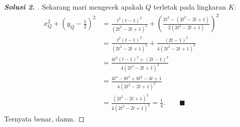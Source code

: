 \begin{proof}[\textbf{Solusi 2. }]
Sekarang mari mengecek apakah $Q$ terletak pada lingkaran $K$:
\begin{align*}
    x_Q^2 + \left(y_Q - \tfrac{1}{2}\right)^2 
    &= \frac{t^2(t-1)^2}{(2t^2-2t+1)^2} + \left(\frac{2t^2 - (2t^2-2t+1)}{2(2t^2-2t+1)}\right)^2\\
    &= \frac{t^2(t-1)^2}{(2t^2-2t+1)^2} + \frac{(2t-1)^2}{4(2t^2-2t+1)^2}\\
    &= \frac{4t^2(t-1)^2 + (2t-1)^2}{4(2t^2-2t+1)^2}\\
    &= \frac{4t^4-8t^3+8t^2-4t+1}{4(2t^2-2t+1)^2}\\
    &= \frac{(2t^2-2t+1)^2}{4(2t^2-2t+1)^2} = \frac{1}{4}. \qquad \blacksquare
\end{align*}
Ternyata benar, damn.
\end{proof}


